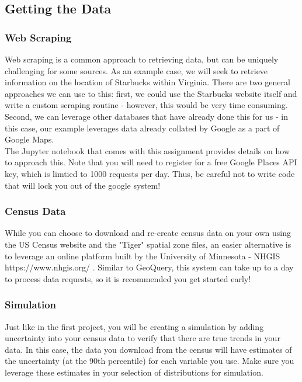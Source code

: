 \documentclass[a4paper, 11pt]{article}
\begin{document}
\subsection{Getting the Data}
\subsubsection{Web Scraping}
Web scraping is a common approach to retrieving data, but can be uniquely challenging for some sources.  As an example case, we will seek to retrieve information on the location of Starbucks within Virginia. There are two general approaches we can use to this: first, we could use the Starbucks website itself and write a custom scraping routine - however, this would be very time consuming.  Second, we can leverage other databases that have already done this for us - in this case, our example leverages data already collated by Google as a part of Google Maps.\\

The Jupyter notebook that comes with this assignment provides details on how to approach this.  Note that you will need to register for a free Google Places API key, which is limtied to 1000 requests per day.  Thus, be careful not to write code that will lock you out of the google system!

\subsubsection{Census Data}
While you can choose to download and re-create census data on your own using the US Census website and the "Tiger" spatial zone files, an easier alternative is to leverage an online platform built by the University of Minnesota - NHGIS https://www.nhgis.org/ .  Similar to GeoQuery, this system can take up to a day to process data requests, so it is recommended you get started early!  

\subsubsection{Simulation}
Just like in the first project, you will be creating a simulation by adding uncertainty into your census data to verify that there are true trends in your data.  In this case, the data you download from the census will have estimates of the uncertainty (at the 90th percentile) for each variable you use.  Make sure you leverage these estimates in your selection of distributions for simulation.
\end{document}
